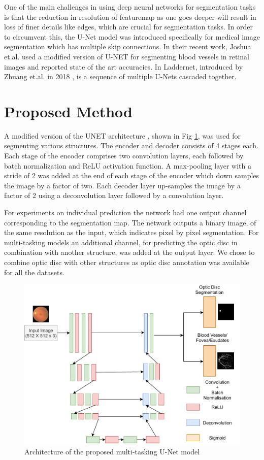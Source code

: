 \documentclass{article}
\begin{document}
One of the main challenges in using deep neural networks for segmentation tasks is that the reduction in resolution of featuremap as one goes deeper will result in loss of finer details like edges, which are crucial for segmentation tasks.
In order to circumvent this, the U-Net \cite{ronneberger2015u} model was introduced specifically for medical image segmentation which has multiple skip connections.
In their recent work, Joshua et.al. \cite{joshua2020blood} used a modified version of U-NET for segmenting blood vessels in retinal images and reported state of the art accuracies.
In Laddernet, introduced by Zhuang et.al. in 2018 \cite{zhuang2018laddernet},  is a sequence of multiple U-Nets cascaded together.

\section{Proposed Method}
A modified version of the UNET architecture \cite{ronneberger2015u}, shown in Fig \ref{unet_combined}, was used for segmenting various structures.
The encoder and decoder consists of 4 stages each.
Each stage of the encoder comprises two convolution layers, each followed by batch normalization and ReLU activation function.
A max-pooling layer with a stride of 2 was added at the end of each stage of the encoder which down samples the image by a factor of two.
Each decoder layer up-samples the image by a factor of 2 using  a deconvolution layer followed by a convolution layer.

For experiments on individual prediction the network had one output channel corresponding to the segmentation map.
The network outputs a binary image, of the same resolution as the input,  which indicates pixel by pixel segmentation.
For multi-tasking models an additional channel, for predicting the optic disc in combination with another structure,  was added at the output layer.
We chose to combine optic disc with other structures as optic disc annotation was available for all the datasets.

\begin{figure}[!ht]
  \centering
  \includegraphics[width=0.9\linewidth]{images/UnetArch.pdf}
  \caption{Architecture of the proposed multi-tasking U-Net model}
  \label{unet_combined}
\end{figure}
\end{document}
